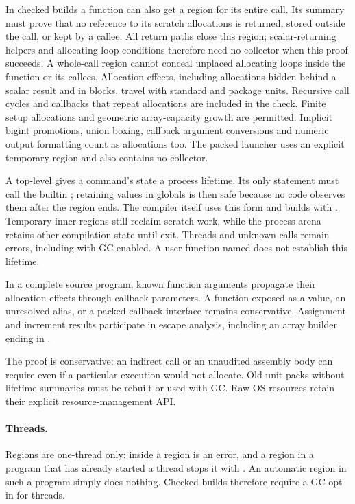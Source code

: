 In checked builds a function can also get a region for its entire call.
Its summary must prove that no reference to its scratch allocations is
returned, stored outside the call, or kept by a callee. All return paths
close this region; scalar-returning helpers and allocating loop conditions
therefore need no collector when this proof succeeds. A whole-call region
cannot conceal unplaced allocating loops inside the function or its callees.
Allocation effects,
including allocations hidden behind a scalar result and in 
blocks, travel with standard and package units. Recursive call cycles and
callbacks that repeat allocations are included in the check. Finite setup
allocations and geometric array-capacity growth are permitted.
Implicit bigint promotions, union boxing, callback argument conversions and
numeric output formatting count as allocations too. The packed launcher uses
an explicit temporary region and also contains no collector.

A top-level  gives a command's state
a process lifetime. Its only statement must call the builtin ;
retaining values in globals is then safe because no code observes them after
the region ends. The compiler itself uses this form and builds with
. Temporary inner regions still reclaim scratch work, while
the process arena retains other compilation state until exit. Threads and
unknown calls remain errors, including with GC enabled. A user function
named  does not establish this lifetime.

In a complete source program, known function arguments propagate their
allocation effects through callback parameters. A function exposed as a
value, an unresolved alias, or a packed callback interface remains
conservative. Assignment and increment results participate in
escape analysis, including an array builder ending in .

The proof is conservative: an indirect call or an unaudited assembly body
can require  even if a particular execution would not allocate.
Old unit packs without lifetime summaries must be rebuilt or used with GC.
Raw OS resources retain their explicit resource-management API.

\paragraph{Threads.} Regions are one-thread only:  inside a
region is an error, and a region in a program that has already started a
thread stops it with . An
automatic region in such a program simply does nothing.
Checked builds therefore require a GC opt-in for threads.
